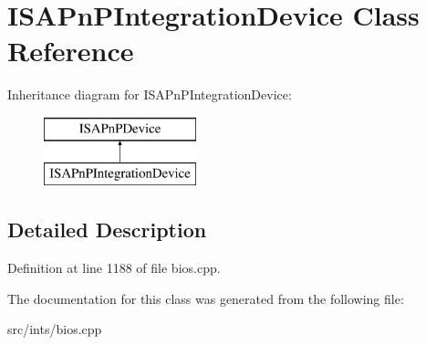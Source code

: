 \hypertarget{classISAPnPIntegrationDevice}{\section{I\-S\-A\-Pn\-P\-Integration\-Device Class Reference}
\label{classISAPnPIntegrationDevice}
}
Inheritance diagram for I\-S\-A\-Pn\-P\-Integration\-Device\-:\begin{figure}[H]
\begin{center}
\leavevmode
\includegraphics[height=2.000000cm]{classISAPnPIntegrationDevice}
\end{center}
\end{figure}


\subsection{Detailed Description}


Definition at line 1188 of file bios.\-cpp.



The documentation for this class was generated from the following file\-:\begin{DoxyCompactItemize}
\item 
src/ints/bios.\-cpp\end{DoxyCompactItemize}
